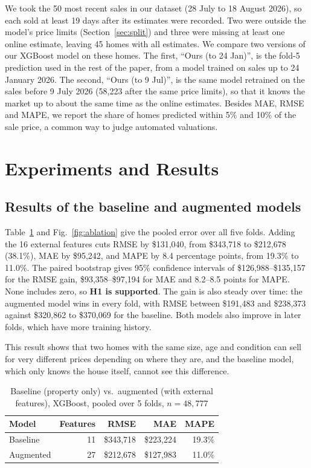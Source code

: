 \documentclass[conference]{IEEEtran}
\begin{document}
We took the 50 most recent sales in our dataset (28 July to 18 August
2026), so each sold at least 19 days after its estimates were recorded.
Two
were outside the model's price limits (Section~\ref{sec:split}) and three
were missing at least one online estimate, leaving 45 homes with all
estimates. We compare two versions of our
XGBoost model on these homes. The first, ``Ours (to 24 Jan)'', is the
fold-5 prediction used in the rest of the paper, from a model trained
on sales up to 24 January 2026. The second, ``Ours (to 9 Jul)'', is the
same model retrained on the sales before 9 July 2026 (58,223 after the
same price limits), so that it knows the market up to about the same
time as the online estimates.
Besides MAE, RMSE and MAPE, we report the share of homes predicted within
5\% and 10\% of the sale price, a common way to judge automated
valuations.

\section{Experiments and Results}\label{sec:results}

\subsection{Results of the baseline and augmented models}\label{sec:res-ablation}
Table~\ref{tab:ablation} and Fig.~\ref{fig:ablation} give the pooled
error over all five folds. Adding the 16 external features cuts RMSE by
\$131,040, from \$343,718 to \$212,678 (38.1\%), MAE by \$95,242, and
MAPE by 8.4 percentage points, from 19.3\% to 11.0\%. The paired
bootstrap gives 95\% confidence intervals of \$126,988--\$135,157 for the
RMSE gain, \$93,358--\$97,194 for MAE and 8.2--8.5 points for MAPE. None
includes zero, so \textbf{H1 is supported}. The gain is also steady over
time: the augmented model wins in every fold, with RMSE between
\$191,483 and \$238,373 against \$320,862 to \$370,069 for the baseline.
Both models also improve in later folds, which have more training
history.

This result shows that two homes with the same size, age and condition
can sell for very different prices depending on where they are, and the
baseline model, which only knows the house itself, cannot see this
difference.

\begin{table}[t]
  \centering
  \caption{Baseline (property only) vs.\ augmented (with external
  features), XGBoost, pooled over 5 folds, $n=48{,}777$}
  \label{tab:ablation}
  \begin{tabular}{@{}lrrrr@{}}
    \toprule
    Model & Features & RMSE & MAE & MAPE \\
    \midrule
    Baseline  & 11 & \$343,718 & \$223,224 & 19.3\% \\
    Augmented & 27 & \$212,678 & \$127,983 & 11.0\% \\
    \bottomrule
  \end{tabular}
\end{table}
\end{document}
